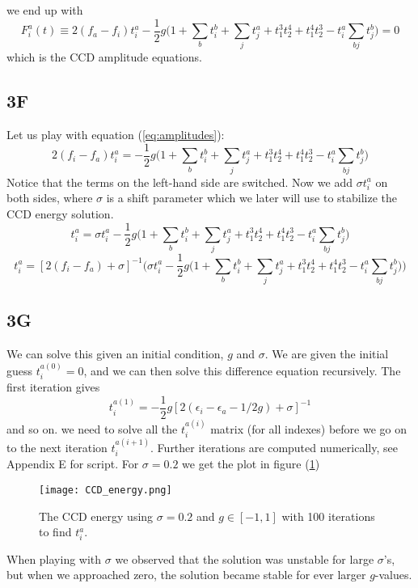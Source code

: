 \documentclass[norsk,a4paper,12pt]{article}
\begin{document}
we end up with
\begin{equation}
F_i^a(t)\equiv2(f_a-f_i)t_i^a-\frac{1}{2}g\bigg(1+\sum_bt_i^b+\sum_jt_j^a+t_1^3t_2^4+t_1^4t_2^3-t_i^a\sum_{bj}t_j^b\bigg)=0
\label{eq:amplitudes}
\end{equation}
which is the CCD amplitude equations. 

\subsection*{3F}
Let us play with equation (\ref{eq:amplitudes}):
\begin{equation*}
2(f_i-f_a)t_i^a=-\frac{1}{2}g\bigg(1+\sum_bt_i^b+\sum_jt_j^a+t_1^3t_2^4+t_1^4t_2^3-t_i^a\sum_{bj}t_j^b\bigg)
\end{equation*}
Notice that the terms on the left-hand side are switched. Now we add $\sigma t_i^a$ on both sides, where $\sigma$ is a shift parameter which we later will use to stabilize the CCD energy solution.
\begin{equation*}
[2(f_i-f_a)+\sigma]t_i^a=\sigma t_i^a-\frac{1}{2}g\Big(1+\sum_bt_i^b+\sum_jt_j^a+t_1^3t_2^4+t_1^4t_2^3-t_i^a\sum_{bj}t_j^b\Big)
\end{equation*}
\begin{equation}
t_i^a=[2(f_i-f_a)+\sigma]^{-1}\bigg(\sigma t_i^a-\frac{1}{2}g\Big(1+\sum_bt_i^b+\sum_jt_j^a+t_1^3t_2^4+t_1^4t_2^3-t_i^a\sum_{bj}t_j^b\Big)\bigg)
\end{equation}

\subsection*{3G}
We can solve this given an initial condition, $g$ and $\sigma$. We are given the initial guess $t_i^{a(0)}=0$, and we can then solve this difference equation recursively. The first iteration gives
\begin{equation*}
t_i^{a(1)}=-\frac{1}{2}g[2(\epsilon_i-\epsilon_a-1/2g)+\sigma]^{-1}
\end{equation*}
and so on. we need to solve all the $t_i^{a(i)}$ matrix (for all indexes) before we go on to the next iteration $t_i^{a(i+1)}$. Further iterations are computed numerically, see Appendix E for script. For $\sigma=0.2$ we get the plot in figure (\ref{fig:CCD_energy})
\begin{figure}[H]
\centering
\texttt{[image: CCD\_energy.png]}
\caption{The CCD energy using $\sigma=0.2$ and $g\in[-1,1]$ with 100 iterations to find $t_i^a$. \label{fig:CCD_energy}}
\end{figure}
When playing with $\sigma$ we observed that the solution was unstable for large $\sigma$'s, but when we approached zero, the solution became stable for ever larger $g$-values. 
\end{document}
